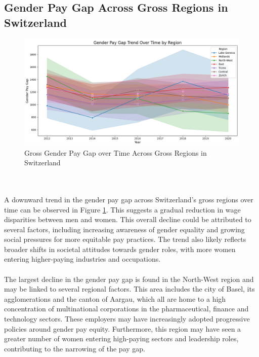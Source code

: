 \documentclass{article}
\begin{document}
\subsection{Gender Pay Gap Across Gross Regions in Switzerland}

\begin{figure}[t]
    \centering
    \includegraphics[width=1\textwidth]{Figures/Pay_Gap_Over_Time_Region.png}
    \caption{Gross Gender Pay Gap over Time Across Gross Regions in Switzerland}
    \label{fig:trend_regions}
\end{figure}
\\
\\
A downward trend in the gender pay gap across Switzerland's gross regions over time can be observed in Figure \ref{fig:trend_regions}. This suggests a gradual reduction in wage disparities between men and women. This overall decline could be attributed to several factors, including increasing awareness of gender equality and growing social pressures for more equitable pay practices. The trend also likely reflects broader shifts in societal attitudes towards gender roles, with more women entering higher-paying industries and occupations.\\
\\
The largest decline in the gender pay gap is found in the North-West region and may be linked to several regional factors. This area includes the city of Basel, its agglomerations and the canton of Aargau, which all are home to a high concentration of multinational corporations in the pharmaceutical, finance and technology sectors. These employers may have increasingly adopted progressive policies around gender pay equity. Furthermore, this region may have seen a greater number of women entering high-paying sectors and leadership roles, contributing to the narrowing of the pay gap.\\
\end{document}
